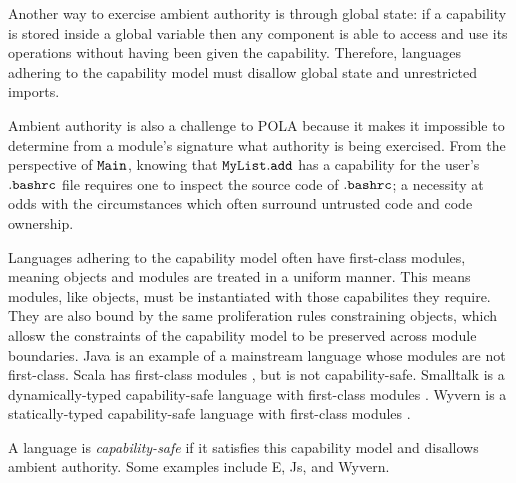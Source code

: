 Another way to exercise ambient authority is through global state: if a capability is stored inside a global variable then any component is able to access and use its operations without having been given the capability. Therefore, languages adhering to the capability model must disallow global state and unrestricted imports.

Ambient authority is also a challenge to POLA because it makes it impossible to determine from a module's signature what authority is being exercised. From the perspective of $\mathtt{Main}$, knowing that $\mathtt{MyList.add}$ has a capability for the user's $\mathtt{.bashrc}$ file requires one to inspect the source code of $\mathtt{.bashrc}$; a necessity at odds with the circumstances which often surround untrusted code and code ownership.

Languages adhering to the capability model often have first-class modules, meaning objects and modules are treated in a uniform manner. This means modules, like objects, must be instantiated with those capabilites they require. They are also bound by the same proliferation rules constraining objects, which allosw the constraints of the capability model to be preserved across module boundaries. Java is an example of a mainstream language whose modules are not first-class. Scala has first-class modules \cite{odersky16}, but is not capability-safe. Smalltalk is a dynamically-typed capability-safe language with first-class modules \cite{bracha10}. Wyvern is a statically-typed capability-safe language \cite{nistor13} with first-class modules \cite{kurilova16}.

A language is \textit{capability-safe} if it satisfies this capability model and disallows ambient authority. Some examples include E, Js, and Wyvern. 
